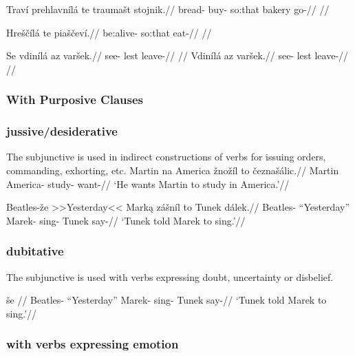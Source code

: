 \pex
\begingl
\gla Traví prehlavnílá te traumašt stojnik.//
\glb bread- buy- {so:that} bakery go-//
\glft {}//
\endgl
\xe

\pex
\begingl
\gla Hreščílá te piaščeví.//
\glb be:alive- {so:that} eat-//
\glft {}//
\endgl
\xe

\pex
\a
\begingl
\gla Se vdinílá az varšek.//
\glb {} see- {lest} leave-//
\glft {}//
\endgl
\a
\begingl
\gla Vdinílá az varšek.//
\glb see- {lest} leave-//
\glft {}//
\endgl
\xe

\subsubsection{With Purposive Clauses}


\subsubsection{jussive/desiderative}
\par The subjunctive is used in indirect constructions of verbs for issuing orders, commanding, exhorting, etc.
\pex
\begingl
\gla Martin na America žnožíl to čeznašálic.//
\glb Martin  America- study-  want-//
\glft `He wants Martin to study in America.'//
\endgl
\xe

\pex
\begingl
\gla Beatles-že >>Yesterday<< Mark\k{a} zášníl to Tunek dálek.//
\glb Beatles- ``Yesterday'' Marek- sing-  Tunek say-//
\glft `Tunek told Marek to sing.'//
\endgl
\xe

\subsubsection{dubitative}
\par The subjunctive is used with verbs expressing doubt, uncertainty or disbelief.

\pex
\begingl
\gla še //
\glb Beatles- ``Yesterday'' Marek- sing-  Tunek say-//
\glft `Tunek told Marek to sing.'//
\endgl
\xe

\subsubsection{with verbs expressing emotion}

